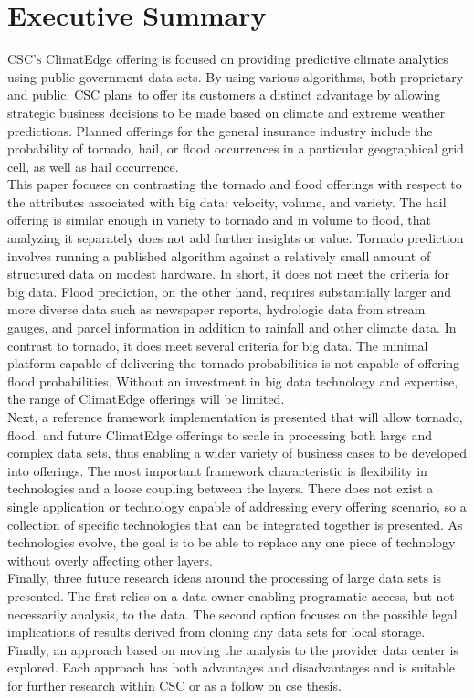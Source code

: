 \section{Executive Summary}
\textsc{CSC's} ClimatEdge\texttrademark{} offering is focused on providing predictive climate analytics using public government data sets. By using various algorithms, both proprietary and public, \textsc{CSC} plans to offer its customers a distinct advantage by allowing strategic business decisions to be made based on climate and extreme weather predictions. Planned offerings for the general insurance industry include the probability of tornado, hail, or flood occurrences in a particular geographical grid cell, as well as hail occurrence.\\

This paper focuses on contrasting the tornado and flood offerings with respect to the attributes associated with big data: velocity, volume, and variety. The hail offering is similar enough in variety to tornado and in volume to flood, that analyzing it separately does not add further insights or value. Tornado prediction involves running a published algorithm against a relatively small amount of structured data on modest hardware. In short, it does not meet the criteria for big data. Flood prediction, on the other hand, requires substantially larger and more diverse data such as newspaper reports, hydrologic data from stream gauges, and parcel information in addition to rainfall and other climate data. In contrast to tornado, it does meet several criteria for big data. The minimal platform capable of delivering the tornado probabilities is not capable of offering flood probabilities. Without an investment in big data technology and expertise, the range of ClimatEdge offerings will be limited.\\

Next, a reference framework implementation is presented that will allow tornado, flood, and future ClimatEdge offerings to scale in processing both large and complex data sets, thus enabling a wider variety of business cases to be developed into offerings. The most important framework characteristic is flexibility in technologies and a loose coupling between the layers. There does not exist a single application or technology capable of addressing every offering scenario, so a collection of specific technologies that can be integrated together is presented. As technologies evolve, the goal is to be able to replace any one piece of technology without overly affecting other layers.\\

Finally, three future research ideas around the processing of large data sets is presented. The first relies on a data owner enabling programatic access, but not necessarily analysis, to the data.  The second option focuses on the possible legal implications of results derived from cloning any data sets for local storage. Finally, an approach based on moving the analysis to the provider data center is explored. Each approach has both advantages and disadvantages and is suitable for further research within \textsc{CSC} or as a follow on \gls{cse} thesis.